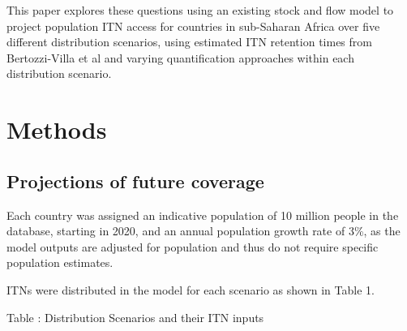 \documentclass[review,
3p]{elsarticle} %
\begin{document}
This paper explores these questions using an existing stock and flow
model \citep{10.1186/s12936-022-04272-w} to project population ITN
access for countries in sub-Saharan Africa over five different
distribution scenarios, using estimated ITN retention times from
Bertozzi-Villa et al \citep{10.1038/s41467-021-23707-7} and varying
quantification approaches within each distribution scenario.

\hypertarget{methods}{%
\section{Methods}\label{methods}}

\hypertarget{projections-of-future-coverage}{%
\subsection{Projections of future
coverage}\label{projections-of-future-coverage}}

Each country was assigned an indicative population of 10 million people
in the database, starting in 2020, and an annual population growth rate
of 3\%, as the model outputs are adjusted for population and thus do not
require specific population estimates.

ITNs were distributed in the model for each scenario as shown in Table
1.

Table : Distribution Scenarios and their ITN inputs
\end{document}
